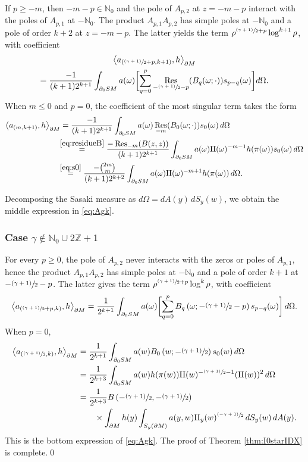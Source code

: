 \documentclass[11pt]{article}
\newcommand{\psfrac}[2]{\sfrac{(#1)}{#2}}
\DeclareMathOperator{\Res}{Res}
\theoremstyle{plain}
\theoremstyle{definition}
\theoremstyle{remark}
\def\Nm{{\mathbb{N}}}
\def\Zm{{\mathbb{Z}}}
\def\two{\mathrm{II}}
\begin{document}
If $p\ge -m$, then $-m-p\in \Nm_0$ and the pole of $A_{p,2}$ at $z = -m-p$ interact with the poles of $A_{p,1}$ at $-\Nm_0$. The product $A_{p,1} A_{p,2}$ has simple poles at $-\Nm_0$ and a pole of order $k+2$ at $z = -m-p$.
The latter yields the term $\rho^{\psfrac{\gamma+1}{2}+p} \log^{k+1} \rho$, with coefficient
\begin{multline*}
\left\langle a_{(\psfrac{\gamma+1}{2}+p, k+1)}, h\right\rangle_{\partial M}\\
= \frac{-1}{(k+1) 2^{k+1}} \int_{\partial_0 SM} a(\omega) \biggl[\sum_{q=0}^p \Res_{- \psfrac{\gamma+1}{2} - p} (B_q(\omega; \cdot)) s_{p-q}(\omega) \biggr] d\Omega.
\end{multline*}
When $m\le 0$ and $p=0$, the coefficient of the most singular term takes the form
\begin{align*}
\left\langle a_{(m, k+1)}, h\right\rangle_{\partial M} &= \frac{-1}{(k+1) 2^{k+1}} \int_{\partial_0 SM} a(\omega) \Res_{-m}(B_0(\omega; \cdot)) s_{0}(\omega)\,d\Omega \\
&\!\!\stackrel{\eqref{eq:residueB}}{=} \frac{-\Res_{-m}(B(z,z))}{(k+1) 2^{k+1}} \int_{\partial_0 SM} a(\omega) \two(\omega)^{-m-1} h(\pi(\omega)) s_{0}(\omega)\,d\Omega \\
&\!\!\stackrel{\eqref{eq:s0}}{=} \frac{-\binom{2m}{m}}{(k+1) 2^{k+2}} \int_{\partial_0 SM} a(\omega) \two(\omega)^{-m+1} h(\pi(\omega))\,d\Omega.
\end{align*}

Decomposing the Sasaki measure as $d\Omega = dA(y)\,dS_y(w)$, we obtain the middle expression in \eqref{eq:Agk}.

\subsubsection*{Case $\gamma\notin \Nm_0\cup 2\Zm +1$}
For every $p\ge 0$, the pole of $A_{p,2}$ never interacts with the zeros or poles of $A_{p,1}$, hence the product $A_{p,1} A_{p,2}$ has simple poles at $-\Nm_0$ and a pole of order $k+1$ at
$-\sfrac{(\gamma+1)}{2}-p$. The latter gives the term $\rho^{\psfrac{\gamma+1}{2}+p} \log^{k} \rho$, with coefficient
\[
\left\langle a_{(\psfrac{\gamma+1}{2}+p,k)}, h\right\rangle_{\partial M} = \frac{1}{2^{k+1}} \int_{\partial_0 SM} a(\omega) \biggl[\sum_{q=0}^{p} B_q\left(\omega; -\psfrac{\gamma+1}{2}-p\right) s_{p-q}(\omega) \biggr]\,d\Omega.
\]
When $p=0$,
\begin{align*}
\left\langle a_{(\psfrac{\gamma+1}{2},k)}, h \right\rangle_{\partial M} &= \frac{1}{2^{k+1}} \int_{\partial_0 SM} a(w) B_0 \left(w; -\psfrac{\gamma+1}{2}\right) s_0 (w)\,d\Omega \\
&= \frac{1}{2^{k+3}} \int_{\partial_0 SM} a(w) h(\pi(w)) \two(w)^{-\psfrac{\gamma+1}{2}-1} (\two(w))^2\,d\Omega \\
&= \frac{1}{2^{k+3}} B\left(-\psfrac{\gamma+1}{2}, -\psfrac{\gamma+1}{2} \right) \\
& \qquad \times \int_{\partial M} h(y) \int_{S_y (\partial M)} a(y,w) \two_y(w)^{\psfrac{-\gamma+1}{2}}\,dS_y(w)\,dA(y).
\end{align*}
This is the bottom expression of \eqref{eq:Agk}. The proof of Theorem \ref{thm:I0starIDX} is complete.\qed
\end{document}
